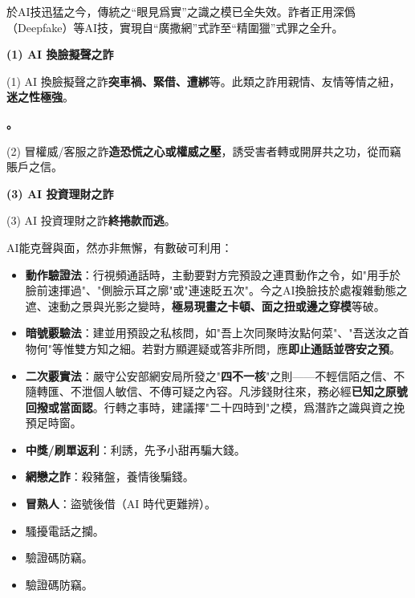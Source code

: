 於AI技迅猛之今，傳統之“眼見爲實”之識之模已全失效。詐者正用深僞（Deepfake）等AI技，實現自“廣撒網”式詐至“精圍獵”式罪之全升。


\textbf{(1) AI 換臉擬聲之詐}\par

(1) AI 換臉擬聲之詐\textbf{突車禍、緊借、遭綁}等。此類之詐用親情、友情等情之紐，\textbf{迷之性極強}。

\textbf{。}\par

(2) 冒權威/客服之詐\textbf{造恐慌之心或權威之壓}，誘受害者轉或開屏共之功，從而竊賬戶之信。

\textbf{(3) AI 投資理財之詐}\par

(3) AI 投資理財之詐\textbf{終捲款而逃}。


AI能克聲與面，然亦非無懈，有數破可利用：

\begin{itemize}
  \item \textbf{動作驗證法}：行視頻通話時，主動要對方完預設之連貫動作之令，如"用手於臉前速揮過"、"側臉示耳之廓"或"連速眨五次"。今之AI換臉技於處複雜動態之遮、速動之景與光影之變時，\textbf{極易現畫之卡頓、面之扭或邊之穿模}等破。
  \item \textbf{暗號覈驗法}：建並用預設之私核問，如"吾上次同聚時汝點何菜"、"吾送汝之首物何"等惟雙方知之細。若對方顯遲疑或答非所問，應\textbf{即止通話並啓安之預}。
  \item \textbf{二次覈實法}：嚴守公安部網安局所發之"\textbf{四不一核}"之則——不輕信陌之信、不隨轉匯、不泄個人敏信、不傳可疑之內容。凡涉錢財往來，務必經\textbf{已知之原號回撥或當面認}。行轉之事時，建議擇"二十四時到"之模，爲潛詐之識與資之挽預足時窗。
\end{itemize}


\begin{itemize}
  \item \textbf{中獎/刷單返利}：利誘，先予小甜再騙大錢。
  \item \textbf{網戀之詐}：殺豬盤，養情後騙錢。
  \item \textbf{冒熟人}：盜號後借（AI 時代更難辨）。
\end{itemize}


\begin{itemize}
  \item 騷擾電話之攔。
  \item 驗證碼防竊。
  \item 驗證碼防竊。
\end{itemize}

